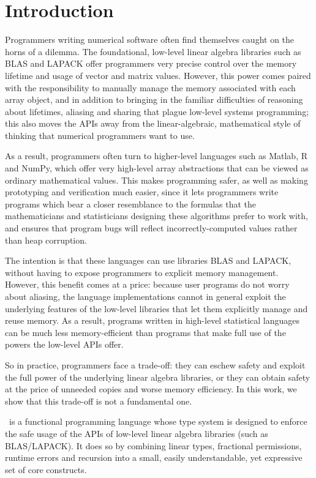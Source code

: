 \section{Introduction}

Programmers writing numerical software often find themselves caught on
the horns of a dilemma. The foundational, low-level linear algebra
libraries such as BLAS and LAPACK offer programmers very precise
control over the memory lifetime and usage of vector and matrix
values. However, this power comes paired with the responsibility to
manually manage the memory associated with each array object, and in
addition to bringing in the familiar difficulties of reasoning about
lifetimes, aliasing and sharing that plague low-level systems
programming; this also moves the APIs away from the linear-algebraic,
mathematical style of thinking that numerical programmers want to use.

As a result, programmers often turn to higher-level languages such as
Matlab, R and NumPy, which offer very high-level array abstractions
that can be viewed as ordinary mathematical values. This makes
programming safer, as well as making prototyping and verification much
easier, since it lets programmers write programs which bear a closer
resemblance to the formulas that the mathematicians and statisticians
designing these algorithms prefer to work with, and ensures that
program bugs will reflect incorrectly-computed values rather than heap
corruption.

The intention is that these languages can use libraries BLAS and
LAPACK, without having to expose programmers to explicit memory
management. However, this benefit comes at a price: because user
programs do not worry about aliasing, the language implementations
cannot in general exploit the underlying features of the low-level
libraries that let them explicitly manage and reuse memory. As a
result, programs written in high-level statistical languages can
be much less memory-efficient than programs that make full use
of the powers the low-level APIs offer. 

So in practice, programmers face a trade-off: they can eschew safety
and exploit the full power of the underlying linear algebra libraries,
or they can obtain safety at the price of unneeded copies and worse
memory efficiency. In this work, we show that this trade-off is not a
fundamental one.

\lang\ is a functional programming language whose type system is
designed to enforce the safe usage of the APIs of low-level linear algebra
libraries (such as BLAS/LAPACK).  It does so by combining linear types,
fractional permissions, runtime errors and recursion into a small, easily
understandable, yet expressive set of core constructs.

